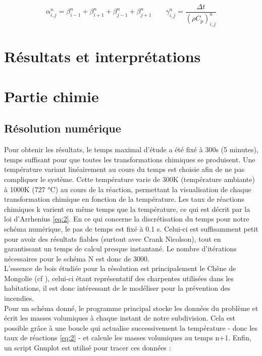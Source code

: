 \documentclass[a4paper,11pt]{article}
\begin{document}
\[
\alpha_{i,j}^n = \beta_{i-1}^n + \beta_{i+1}^n + \beta_{j-1}^n + \beta_{j+1}^n
\qquad
\gamma_{i,j}^n = \frac{\Delta t}{(\rho C_p)_{i,j}^n}
\]
\section*{Résultats et interprétations}\label{sec:ri}


\section{Partie chimie}
 
\subsection{Résolution numérique}

Pour obtenir les résultats, le temps maximal d'étude a été fixé à 300s (5 minutes), temps suffisant pour que toutes les transformations chimiques se produisent. Une température variant linéairement au cours du temps est choisie afin de ne pas compliquer le système. Cette température varie de 300K (température ambiante) à 1000K (727 °C) au cours de la réaction, permettant la visualisation de chaque transformation chimique en fonction de la température. Les taux de réactions chimiques k varient en même temps que la température, ce qui est décrit par la loi d'Arrhenius \eqref{eq:2}. En ce qui concerne la discrétisation du temps pour notre schéma numérique, le pas de temps est fixé à 0.1 s. Celui-ci est suffisamment petit pour avoir des résultats fiables (surtout avec Crank Nicolson), tout en garantissant un temps de calcul presque instantané. Le nombre d'itérations nécessaires pour le schéma N est donc de 3000. 
\\

L'essence de bois étudiée pour la résolution est principalement le Chêne de Mongolie (cf \cite{1}), celui-ci étant représentatif des charpentes utilisées dans les habitations, il est donc intéressant de le modéliser pour la prévention des incendies. \\

Pour un schéma donné, le programme principal stocke les données du problème et écrit les masses volumiques à chaque instant de notre subdivision. Cela est possible grâce à une boucle qui actualise successivement la température - donc les taux de réactions \eqref{eq:2} - et calcule les masses volumiques au temps n+1. Enfin, un script Gnuplot est utilisé pour tracer ces données :
\end{document}
